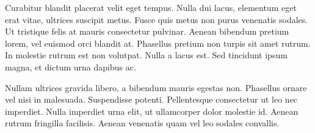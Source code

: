 Curabitur blandit placerat velit eget tempus. Nulla dui lacus, elementum eget erat vitae, ultrices suscipit metus. Fusce quis metus non purus venenatis sodales. Ut tristique felis at mauris consectetur pulvinar. Aenean bibendum pretium lorem, vel euismod orci blandit at. Phasellus pretium non turpis sit amet rutrum. In molestie rutrum est non volutpat. Nulla a lacus est. Sed tincidunt ipsum magna, et dictum urna dapibus ac.

Nullam ultrices gravida libero, a bibendum mauris egestas non. Phasellus ornare vel nisi in malesuada. Suspendisse potenti. Pellentesque consectetur ut leo nec imperdiet. Nulla imperdiet urna elit, ut ullamcorper dolor molestie id. Aenean rutrum fringilla facilisis. Aenean venenatis quam vel leo sodales convallis.

